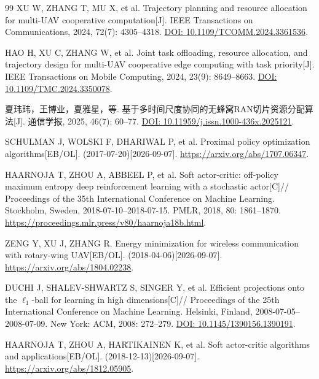\begin{thebibliography}{99}
\small
\setlength{\itemsep}{2pt}
XU W, ZHANG T, MU X, et al.
Trajectory planning and resource allocation for multi-UAV cooperative computation[J].
IEEE Transactions on Communications, 2024, 72(7): 4305--4318.
\href{https://doi.org/10.1109/TCOMM.2024.3361536}{DOI: 10.1109/TCOMM.2024.3361536}.

HAO H, XU C, ZHANG W, et al.
Joint task offloading, resource allocation, and trajectory design for multi-UAV cooperative edge computing with task priority[J].
IEEE Transactions on Mobile Computing, 2024, 23(9): 8649--8663.
\href{https://doi.org/10.1109/TMC.2024.3350078}{DOI: 10.1109/TMC.2024.3350078}.

夏玮玮，王博业，夏雅星，等.
基于多时间尺度协同的无蜂窝RAN切片资源分配算法[J].
通信学报, 2025, 46(7): 60--77.
\href{https://doi.org/10.11959/j.issn.1000-436x.2025121}{DOI: 10.11959/j.issn.1000-436x.2025121}.

SCHULMAN J, WOLSKI F, DHARIWAL P, et al.
Proximal policy optimization algorithms[EB/OL].
(2017-07-20)[2026-09-07].
\url{https://arxiv.org/abs/1707.06347}.

HAARNOJA T, ZHOU A, ABBEEL P, et al.
Soft actor-critic: off-policy maximum entropy deep reinforcement learning with a stochastic actor[C]//
Proceedings of the 35th International Conference on Machine Learning.
Stockholm, Sweden, 2018-07-10--2018-07-15.
PMLR, 2018, 80: 1861--1870.
\url{https://proceedings.mlr.press/v80/haarnoja18b.html}.

ZENG Y, XU J, ZHANG R.
Energy minimization for wireless communication with rotary-wing UAV[EB/OL].
(2018-04-06)[2026-09-07].
\url{https://arxiv.org/abs/1804.02238}.

DUCHI J, SHALEV-SHWARTZ S, SINGER Y, et al.
Efficient projections onto the $\ell_1$-ball for learning in high dimensions[C]//
Proceedings of the 25th International Conference on Machine Learning.
Helsinki, Finland, 2008-07-05--2008-07-09.
New York: ACM, 2008: 272--279.
\href{https://doi.org/10.1145/1390156.1390191}{DOI: 10.1145/1390156.1390191}.

HAARNOJA T, ZHOU A, HARTIKAINEN K, et al.
Soft actor-critic algorithms and applications[EB/OL].
(2018-12-13)[2026-09-07].
\url{https://arxiv.org/abs/1812.05905}.
\end{thebibliography}
